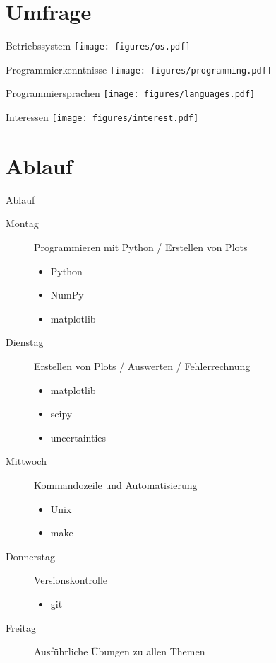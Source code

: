 \section{Umfrage}


\begin{frame}{Betriebssystem}
  \centering
  \texttt{[image: figures/os.pdf]}
\end{frame}

\begin{frame}{Programmierkenntnisse}
  \centering
  \texttt{[image: figures/programming.pdf]}
\end{frame}

\begin{frame}{Programmiersprachen}
  \centering
  \texttt{[image: figures/languages.pdf]}
\end{frame}

\begin{frame}{Interessen}
  \centering
  \texttt{[image: figures/interest.pdf]}
\end{frame}

\section{Ablauf}

\begin{frame}{Ablauf}
  \begin{description}
    \item[Montag] Programmieren mit Python / Erstellen von Plots
      \begin{itemize}
        \item Python
        \item NumPy
        \item matplotlib
      \end{itemize}
    \item[Dienstag] Erstellen von Plots / Auswerten / Fehlerrechnung
      \begin{itemize}
        \item matplotlib
        \item scipy
        \item uncertainties
      \end{itemize}
    \item[Mittwoch] Kommandozeile und Automatisierung
      \begin{itemize}
        \item Unix
        \item make
      \end{itemize}
    \item[Donnerstag] Versionskontrolle
      \begin{itemize}
        \item git
      \end{itemize}
    \item[Freitag] Ausführliche Übungen zu allen Themen
  \end{description}
\end{frame}

